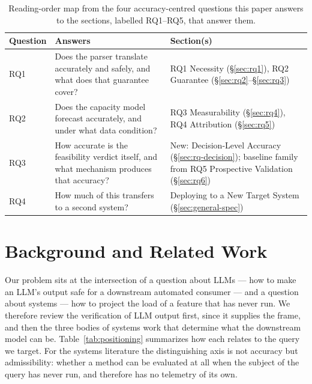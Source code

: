 \documentclass[journal, 10pt]{IEEEtran}
\begin{document}
\begin{table}[!t]
\centering
\caption{Reading-order map from the four accuracy-centred questions this paper
answers to the sections, labelled RQ1--RQ5, that answer them.}
\label{tab:rq-map}
\footnotesize
\begin{tabular}{p{1.1cm}p{3.0cm}p{3.5cm}}
\toprule
\textbf{Question} & \textbf{Answers} & \textbf{Section(s)} \\
\midrule
RQ1 & Does the parser translate accurately and safely, and what does that guarantee cover? & RQ1 Necessity (\S\ref{sec:rq1}), RQ2 Guarantee (\S\ref{sec:rq2}--\S\ref{sec:rq3}) \\
RQ2 & Does the capacity model forecast accurately, and under what data condition? & RQ3 Measurability (\S\ref{sec:rq4}), RQ4 Attribution (\S\ref{sec:rq5}) \\
RQ3 & How accurate is the feasibility verdict itself, and what mechanism produces that accuracy? & New: Decision-Level Accuracy (\S\ref{sec:rq-decision}); baseline family from RQ5 Prospective Validation (\S\ref{sec:rq6}) \\
RQ4 & How much of this transfers to a second system? & Deploying to a New Target System (\S\ref{sec:general-spec}) \\
\bottomrule
\end{tabular}
\end{table}

\section{Background and Related Work}
\label{sec:background}

Our problem sits at the intersection of a question about LLMs --- how to make an
LLM's output safe for a downstream automated consumer --- and a question about
systems --- how to project the load of a feature that has never run. We therefore
review the verification of LLM output first, since it supplies the frame, and then
the three bodies of systems work that determine what the downstream model can be.
Table~\ref{tab:positioning} summarizes how each relates to the query we target.
For the systems literature the distinguishing axis is not accuracy but
admissibility: whether a method can be evaluated at all when the subject of the
query has never run, and therefore has no telemetry of its own.
\end{document}
